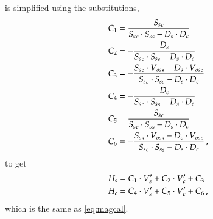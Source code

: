  is simplified using the substitutions,
\begin{equation}
    \begin{aligned}
        C_1 &=   \frac{{S_s}_c}{{S_s}_c \cdot {S_s}_s - D_s \cdot D_c}\\
        C_2 &= - \frac{D_s}{{S_s}_c \cdot {S_s}_s - D_s \cdot D_c}\\
        C_3 &= - \frac{{S_s}_c \cdot {V_{os}}_s  -D_s \cdot {V_{os}}_c}{{S_s}_c \cdot {S_s}_s - D_s \cdot D_c}\\
        C_4 &= - \frac{D_c}{{S_s}_c \cdot {S_s}_s - D_s \cdot D_c}\\
        C_5 &= \frac{{S_s}_c}{{S_s}_c \cdot {S_s}_s - D_s \cdot D_c}\\
        C_6 &= - \frac{{S_s}_s \cdot {V_{os}}_s  -D_c \cdot {V_{os}}_c}{{S_s}_c \cdot {S_s}_s - D_s \cdot D_c} \,,
    \end{aligned}
    \label{eq:cal-sub}
\end{equation}
 to get
\begin{equation}
    \begin{split}
        H_s &= C_1 \cdot V_s' + C_2 \cdot V_c' + C_3\\
        H_c &= C_4 \cdot V_s' + C_5 \cdot V_c' + C_6 \,,
    \end{split}
    \label{eq:magcal2}
\end{equation}
which is the same as \cref{eq:magcal}.



